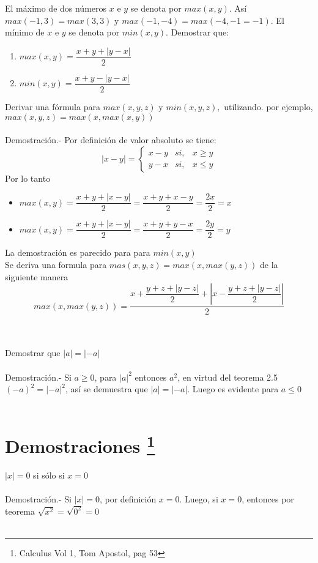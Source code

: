 \begin{teo}
El máximo de dos números $x$ e $y$ se denota por $max(x,y)$. Así $max(-1,3)=max(3,3)$ y $max(-1,-4)=max(-4,-1=-1)$. El mínimo de $x$ e $y$ se denota por $min(x,y)$. Demostrar que:
\begin{enumerate}[\bfseries 1.]
\item $max(x,y)=\dfrac{x+y+|y-x|}{2}$
\item $min(x,y)=\dfrac{x+y-|y-x|}{2}$
\end{enumerate}
Derivar una fórmula para $max(x,y,z)$ y $min(x,y,z),$ utilizando. por ejemplo, $max(x,y,z)=max(x,max(x,y))$ \\\\
Demostración.- \; Por definición de valor absoluto se tiene:
\begin{equation}
|x-y| = \left\lbrace
\begin{array}{crr}
x-y& si, & x\geq y\\
y-x& si, & x \leq y
\end{array}
\right.
\end{equation}
Por lo tanto 
\begin{itemize}
\item $max(x,y) = \dfrac{x+y+|x-y|}{2}= \dfrac{x+y+x-y}{2} =\dfrac{2x}{2}=x$\\
\item $max(x,y) = \dfrac{x+y+|x-y|}{2}= \dfrac{x+y+y-x}{2} =\dfrac{2y}{2}=y$
\end{itemize} 
La demostración es parecido para para $min(x,y)$\\
Se deriva una formula para $mas(x,y,z)=max(x,max(y,z))$ de la siguiente manera\\
$$max(x,max(y,z))=\dfrac{x+\dfrac{y+z+|y-z|}{2} + \left| x - \dfrac{y+z+|y-z|}{2} \right|}{2}$$\\\\ 
\end{teo}

\begin{teo}
Demostrar que $|a|=|-a|$\\\\
Demostración.- \; Si $a\geq 0$, para $|a|^2$ entonces $a^2$, en virtud del teorema 2.5 $(-a)^2=|-a|^2$, así se demuestra que $|a|=|-a|$. Luego es evidente para $a \leq 0$\\\\
\end{teo} 

\section[Demostraciones]{Demostraciones \footnote{Calculus Vol 1, Tom Apostol, pag 53}}
\begin{teo}
$|x|=0$ si sólo si $x=0$\\\\
Demostración.- \; Si $|x|=0$, por definición $x=0$. Luego, si $x=0$, entonces por teorema $\sqrt{x^2}=\sqrt{0^2}=0$\\\\
\end{teo}

